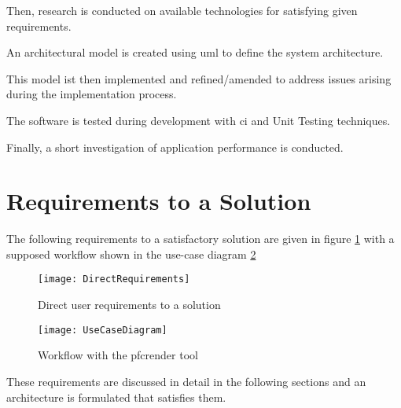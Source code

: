 Then, research is conducted on available technologies for satisfying given requirements.

An architectural model is created using \gls{uml} to define the system architecture.

This model ist then implemented and refined/amended to address issues arising during the implementation process.

The software is tested during development with \gls{ci} and \gls{Unit Testing} techniques.

Finally, a short investigation of application performance is conducted.

\section{Requirements to a Solution}
The following requirements to a satisfactory solution are given in figure \ref{fig:directreq} with a supposed workflow shown in the use-case diagram \ref{fig:uc}

\begin{figure}[h]
	\texttt{[image: DirectRequirements]}
	\caption{Direct user requirements to a solution}
	\label{fig:directreq}
\end{figure}


\begin{figure}
	\texttt{[image: UseCaseDiagram]}
	\caption{Workflow with the pfcrender tool}
	\label{fig:uc}
\end{figure}

These requirements are discussed in detail in the following sections and an architecture is formulated that satisfies them.
